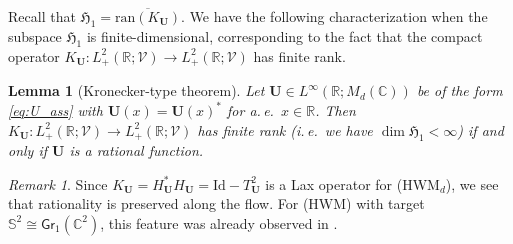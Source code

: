 \documentclass[11pt,reqno]{amsart}
\newtheorem{lem}{Lemma}[section]
\theoremstyle{definition}
\theoremstyle{remark}
\theoremstyle{remark}
\newtheorem{remark}{Remark}[section]
\numberwithin{equation}{section}
\newcommand{\Hfr}{\mathfrak{H}}
\newcommand{\C}{\mathbb{C}}
\newcommand{\R}{\mathbb{R}}
\newcommand{\Ss}{\mathbb{S}}
\newcommand{\VV}{\mathcal{V}}
\newcommand{\ov}{\overline}
\newcommand{\ran}{\mathrm{ran}}
\newcommand{\Ub}{\mathbf{U}}
\newcommand{\id}{\mathrm{Id}}
\newcommand{\Gr}{\mathsf{Gr}}
\begin{document}
Recall that $\Hfr_1= \ov{\ran(K_{\Ub})}$. We have the following characterization when the subspace $\Hfr_1$ is finite-dimensional, corresponding to the fact that the compact operator $K_{\Ub} : L^2_+(\R; \VV) \to L^2_+(\R; \VV)$ has finite rank. 

\begin{lem}[Kronecker-type theorem]  \label{lem:kronecker} Let $\Ub \in L^\infty(\R; M_d(\C))$ be of the form \eqref{eq:U_ass} with $\Ub(x) = \Ub(x)^*$ for a.\,e.~$x \in \R$. Then $K_\Ub : L^2_+(\R; \VV) \to L^2_+(\R;\VV)$ has finite rank (i.\,e.~we have $\dim \Hfr_1 < \infty$) if and only if $\Ub$ is a rational function.
\end{lem}

\begin{remark}
Since $K_{\Ub}=H_{\Ub}^* H_{\Ub}= \id-T_{\Ub}^2$ is a Lax operator for (HWM$_d$), we see that rationality is preserved along the flow. For (HWM) with target $\Ss^2 \cong \Gr_1(\C^2)$, this feature was already observed in \cite{GeLe-18}.
\end{remark}
\end{document}
